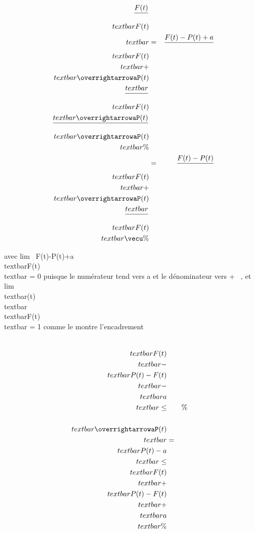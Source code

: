 \begin{align*} F(t) \over
\\textbar{}F(t)\\textbar{} & =& F(t)
- P(t) + a \over
\\textbar{}F(t)\\textbar{} +
\\textbar{}\overrightarrowaP(t)\\textbar{}
\over
\\textbar{}F(t)\\textbar{} 
\overrightarrowaP(t) \over
\\textbar{}\overrightarrowaP(t)\\textbar{}
\%& \\ & =& F(t) - P(t)
\over
\\textbar{}F(t)\\textbar{} +
\\textbar{}\overrightarrowaP(t)\\textbar{}
\over
\\textbar{}F(t)\\textbar{}
\vecu \%& \\
\end{align*}

avec lim~ F(t)-P(t)+a \over
\\textbar{}F(t)\\textbar{} = 0 puisque
le numérateur tend vers a et le dénominateur vers + \infty~, et
lim~
\\textbar{}\overrightarrowaP(t)\\textbar{}
\over
\\textbar{}F(t)\\textbar{} = 1 comme le
montre l'encadrement

\begin{align*}
\\textbar{}F(t)\\textbar{}
-\\textbar{} P(t) - F(t)\\textbar{}
-\\textbar{} a\\textbar{} \leq&& \%&
\\
\\textbar{}\overrightarrowaP(t)\\textbar{}&
=& \\textbar{}P(t) - a\\textbar{}
\leq\\textbar{} F(t)\\textbar{}
+\\textbar{} P(t) - F(t)\\textbar{}
+\\textbar{} a\\textbar{}\%&
\\ \end{align*}

